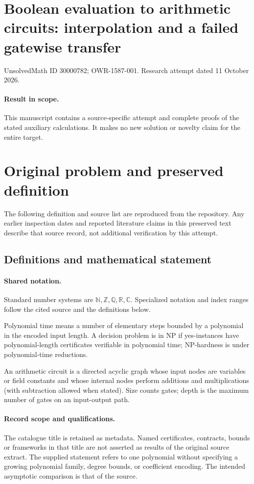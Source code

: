 \documentclass[11pt]{article}
\begin{document}
\section*{Boolean evaluation to arithmetic circuits: interpolation and a failed gatewise transfer}
\noindent UnsolvedMath ID 30000782; OWR-1587-001. Research attempt dated 11 October 2026.
\paragraph{Result in scope.}This manuscript contains a source-specific attempt and complete proofs of the stated auxiliary calculations. It makes no new solution or novelty claim for the entire target.
\section{Original problem and preserved definition}
The following definition and source list are reproduced from the repository. Any earlier inspection dates and reported literature claims in this preserved text describe that source record, not additional verification by this attempt.
\subsection{Definitions and mathematical statement}

\paragraph{Shared notation.}Standard number systems are $\mathbb N,\mathbb Z,\mathbb Q,\mathbb R,\mathbb C$. Specialized notation and index ranges follow the cited source and the definitions below.


Polynomial time means a number of elementary steps bounded by a polynomial in the encoded input length. A decision problem is in $\mathrm{NP}$ if yes-instances have polynomial-length certificates verifiable in polynomial time; NP-hardness is under polynomial-time reductions.

An arithmetic circuit is a directed acyclic graph whose input nodes are variables or field constants and whose internal nodes perform additions and multiplications (with subtraction allowed when stated). Size counts gates; depth is the maximum number of gates on an input-output path.
\paragraph{Record scope and qualifications.}
The catalogue title is retained as metadata. Named certificates, contracts, bounds or frameworks in that title are not asserted as results of the original source extract.
The supplied statement refers to one polynomial without specifying a growing polynomial family, degree bounds, or coefficient encoding. The intended asymptotic comparison is that of the source.
\end{document}
